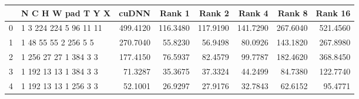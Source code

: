 \begin{tabular}{llrrrrrr}
\toprule
{} &       N C H W pad T Y X &     cuDNN &    Rank 1 &    Rank 2 &    Rank 4 &    Rank 8 &   Rank 16 \\
\midrule
0 &  1 3 224 224 5 96 11 11 &  499.4120 &  116.3480 &  117.9190 &  141.7290 &  267.6040 &  521.4560 \\
1 &    1 48 55 55 2 256 5 5 &  270.7040 &   55.8230 &   56.9498 &   80.0926 &  143.1820 &  267.8980 \\
2 &   1 256 27 27 1 384 3 3 &  177.4150 &   76.5937 &   82.4579 &   99.7787 &  182.4620 &  368.8450 \\
3 &   1 192 13 13 1 384 3 3 &   71.3287 &   35.3675 &   37.3324 &   44.2499 &   84.7380 &  122.7740 \\
4 &   1 192 13 13 1 256 3 3 &   52.1001 &   26.9297 &   27.9176 &   32.7843 &   62.6152 &   95.4771 \\
\bottomrule
\end{tabular}

